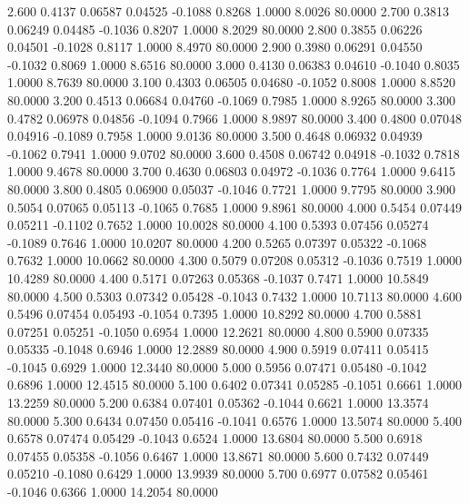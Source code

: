    2.600   0.4137   0.06587   0.04525  -0.1088   0.8268   1.0000   8.0026  80.0000
   2.700   0.3813   0.06249   0.04485  -0.1036   0.8207   1.0000   8.2029  80.0000
   2.800   0.3855   0.06226   0.04501  -0.1028   0.8117   1.0000   8.4970  80.0000
   2.900   0.3980   0.06291   0.04550  -0.1032   0.8069   1.0000   8.6516  80.0000
   3.000   0.4130   0.06383   0.04610  -0.1040   0.8035   1.0000   8.7639  80.0000
   3.100   0.4303   0.06505   0.04680  -0.1052   0.8008   1.0000   8.8520  80.0000
   3.200   0.4513   0.06684   0.04760  -0.1069   0.7985   1.0000   8.9265  80.0000
   3.300   0.4782   0.06978   0.04856  -0.1094   0.7966   1.0000   8.9897  80.0000
   3.400   0.4800   0.07048   0.04916  -0.1089   0.7958   1.0000   9.0136  80.0000
   3.500   0.4648   0.06932   0.04939  -0.1062   0.7941   1.0000   9.0702  80.0000
   3.600   0.4508   0.06742   0.04918  -0.1032   0.7818   1.0000   9.4678  80.0000
   3.700   0.4630   0.06803   0.04972  -0.1036   0.7764   1.0000   9.6415  80.0000
   3.800   0.4805   0.06900   0.05037  -0.1046   0.7721   1.0000   9.7795  80.0000
   3.900   0.5054   0.07065   0.05113  -0.1065   0.7685   1.0000   9.8961  80.0000
   4.000   0.5454   0.07449   0.05211  -0.1102   0.7652   1.0000  10.0028  80.0000
   4.100   0.5393   0.07456   0.05274  -0.1089   0.7646   1.0000  10.0207  80.0000
   4.200   0.5265   0.07397   0.05322  -0.1068   0.7632   1.0000  10.0662  80.0000
   4.300   0.5079   0.07208   0.05312  -0.1036   0.7519   1.0000  10.4289  80.0000
   4.400   0.5171   0.07263   0.05368  -0.1037   0.7471   1.0000  10.5849  80.0000
   4.500   0.5303   0.07342   0.05428  -0.1043   0.7432   1.0000  10.7113  80.0000
   4.600   0.5496   0.07454   0.05493  -0.1054   0.7395   1.0000  10.8292  80.0000
   4.700   0.5881   0.07251   0.05251  -0.1050   0.6954   1.0000  12.2621  80.0000
   4.800   0.5900   0.07335   0.05335  -0.1048   0.6946   1.0000  12.2889  80.0000
   4.900   0.5919   0.07411   0.05415  -0.1045   0.6929   1.0000  12.3440  80.0000
   5.000   0.5956   0.07471   0.05480  -0.1042   0.6896   1.0000  12.4515  80.0000
   5.100   0.6402   0.07341   0.05285  -0.1051   0.6661   1.0000  13.2259  80.0000
   5.200   0.6384   0.07401   0.05362  -0.1044   0.6621   1.0000  13.3574  80.0000
   5.300   0.6434   0.07450   0.05416  -0.1041   0.6576   1.0000  13.5074  80.0000
   5.400   0.6578   0.07474   0.05429  -0.1043   0.6524   1.0000  13.6804  80.0000
   5.500   0.6918   0.07455   0.05358  -0.1056   0.6467   1.0000  13.8671  80.0000
   5.600   0.7432   0.07449   0.05210  -0.1080   0.6429   1.0000  13.9939  80.0000
   5.700   0.6977   0.07582   0.05461  -0.1046   0.6366   1.0000  14.2054  80.0000

